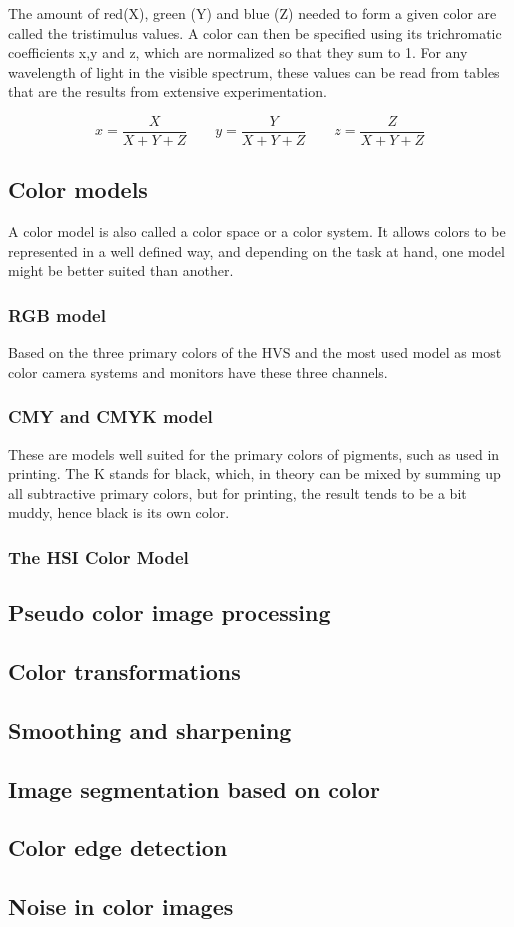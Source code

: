 The amount of red(X), green (Y) and blue (Z) needed to form a given color are called the tristimulus values.
A color can then be specified using its trichromatic coefficients x,y and z, which are normalized so that they sum to 1.
For any wavelength of light in the visible spectrum, these values can be read from tables that are the results from extensive experimentation.

\[
	x = \frac{X}{X+Y+Z} \qquad
	y = \frac{Y}{X+Y+Z} \qquad
	z = \frac{Z}{X+Y+Z}
\]



\subsection{Color models }
A color model is also called a color space or a color system. It allows colors to be represented in a well defined way, and depending on the task at hand, one model might be better suited than another.

\subsubsection{RGB model }
Based on the three primary colors of the HVS and the most used model as most color camera systems and monitors have these three channels.


\subsubsection{CMY and CMYK model }
These are models well suited for the primary colors of pigments, such as used in printing. The K stands for black, which, in theory can be mixed by summing up all subtractive primary colors, but for printing, the result tends to be a bit muddy, hence black is its own color.

\subsubsection{The HSI Color Model }

\subsection{Pseudo color image processing }

\subsection{Color transformations }

\subsection{Smoothing and sharpening }

\subsection{Image segmentation based on color }

\subsection{Color edge detection }

\subsection{Noise in color images }